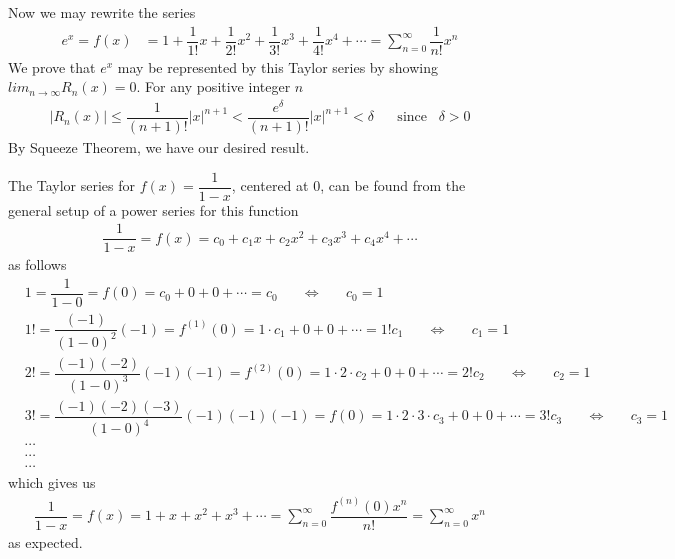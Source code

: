 \begin{example}
Now we may rewrite the series
\begin{align*}
    e^{x} = f(x) &= 1 + \dfrac{1}{1!}x + \dfrac{1}{2!}x^{2} + \dfrac{1}{3!}x^{3} + \dfrac{1}{4!}x^{4} + \cdots = \sum_{n=0}^{\infty} \dfrac{1}{n!}x^{n}
\end{align*}
We prove that $e^{x}$ may be represented by this Taylor series by showing $lim_{n \longrightarrow \infty}R_{n}(x) = 0$. For any positive integer $n$
\begin{align*}
    \lvert R_{n}(x) \rvert \leq \dfrac{1}{(n+1)!} \lvert x \rvert^{n+1} < \dfrac{e^{\delta}}{(n+1)!} \lvert x \rvert^{n+1} < \delta \hspace{20pt} \text{since} \hspace{10pt} \delta > 0
\end{align*}
By Squeeze Theorem, we have our desired result.
\end{example}


\begin{example}
The Taylor series for $f(x) = \dfrac{1}{1-x}$, centered at $0$, can be found from the general setup of a power series for this function
\begin{align*}
    \dfrac{1}{1-x} = f(x) = c_{0} + c_{1}x + c_{2}x^{2} + c_{3}x^{3} + c_{4}x^{4} + \cdots
\end{align*}
as follows
\begin{align*}
    &1 = \dfrac{1}{1-0} = f(0) = c_{0} + 0 + 0 + \cdots = c_{0} \hspace{20pt} \Longleftrightarrow \hspace{20pt} c_{0} = 1\\[2ex]
    &1! = \dfrac{(-1)}{(1-0)^{2}}(-1) = f^{(1)}(0) = 1 \cdot c_{1} + 0 + 0 + \cdots = 1!c_{1} \hspace{20pt} \Longleftrightarrow \hspace{20pt} c_{1} = 1\\[2ex]
    &2! = \dfrac{(-1)(-2)}{(1-0)^{3}}(-1)(-1) = f^{(2)}(0) = 1 \cdot 2 \cdot c_{2} + 0 + 0 + \cdots = 2!c_{2} \hspace{20pt} \Longleftrightarrow \hspace{20pt} c_{2} = 1\\[2ex]
    &3! = \dfrac{(-1)(-2)(-3)}{(1-0)^{4}}(-1)(-1)(-1) = f(0) = 1 \cdot 2 \cdot 3 \cdot c_{3} + 0 + 0 + \cdots = 3!c_{3} \hspace{20pt} \Longleftrightarrow \hspace{20pt} c_{3} = 1\\[1ex]
    &\cdots\\[1ex]
    &\cdots\\[1ex]
    &\cdots
\end{align*}
which gives us
\begin{align*}
    \dfrac{1}{1-x} = f(x) = 1 + x + x^{2} + x^{3} + \cdots = \sum_{n=0}^{\infty} \dfrac{f^{(n)}(0)x^{n}}{n!} = \sum_{n=0}^{\infty} x^{n}
\end{align*}
as expected.
\end{example}

